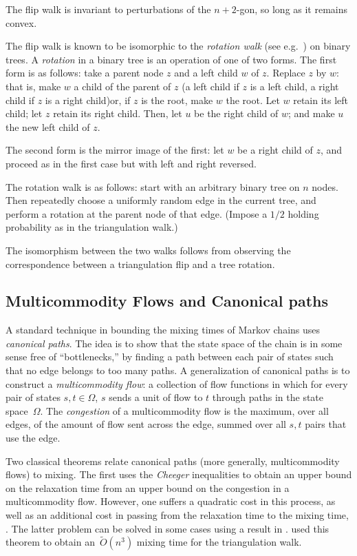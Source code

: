 \documentclass[a4paper, 12p]{article}
\numberwithin{equation}{section}
\begin{document}
The flip walk is invariant to perturbations of the $n+2$-gon, so long as it remains convex. 

The flip walk is known to be isomorphic to the \emph{rotation walk} (see e.g.~\cite{sleator1988rotation}) on binary trees. A \emph{rotation} in a binary tree is an operation of one of two forms. The first form is as follows: take a parent node $z$ and a left child $w$ of $z$. Replace $z$ by $w$: that is, make $w$ a child of the parent of $z$ (a left child if $z$ is a left child, a right child if $z$ is a right child)\textemdash or, if $z$ is the root, make $w$ the root. Let $w$ retain its left child; let $z$ retain its right child. Then, let $u$ be the right child of $w$; and make $u$ the new left child of $z$.

The second form is the mirror image of the first: let $w$ be a right child of $z$, and proceed as in the first case but with left and right reversed.

The rotation walk is as follows: start with an arbitrary binary tree on $n$ nodes. Then repeatedly choose a uniformly random edge in the current tree, and perform a rotation at the parent node of that edge. (Impose a $1/2$ holding probability as in the triangulation walk.)

The isomorphism between the two walks follows from observing the correspondence between a triangulation flip and a tree rotation.

\subsection{Multicommodity Flows and Canonical paths}
\label{sec:mcflow}
A standard technique in bounding the mixing times of Markov chains uses \emph{canonical paths}. The idea is to show that the state space of the chain is in some sense free of ``bottlenecks,'' by finding a path between each pair of states such that no edge belongs to too many paths. A generalization of canonical paths is to construct a \emph{multicommodity flow}: a collection of flow functions in which for every pair of states $s, t \in \Omega$, $s$ sends a unit of flow to $t$ through paths in the state space~$\Omega$. The \emph{congestion} of a multicommodity flow is the maximum, over all edges, of the amount of flow sent across the edge, summed over all $s,t$ pairs that use the edge.

Two classical theorems relate canonical paths (more generally, multicommodity flows) to mixing. The first uses the \emph{Cheeger} inequalities to obtain an upper bound on the relaxation time from an upper bound on the congestion in a multicommodity flow. However, one suffers a quadratic cost in this process, as well as an additional cost in passing from the relaxation time to the mixing time, \cite[Theorem 2.1]{Trevisan13}. The latter problem can be solved in some cases using a result in \cite{avgcond}. \cite{eppstein2022improved} used this theorem to obtain an~$\widetilde O(n^3)$ mixing time for the triangulation walk.
\end{document}
